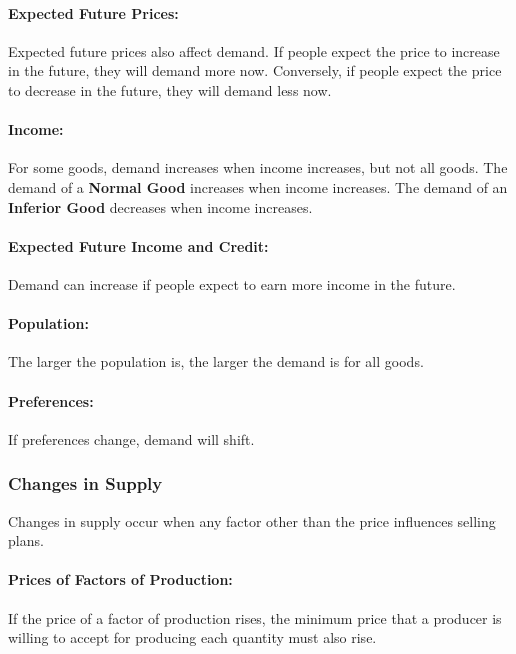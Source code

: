 \documentclass[letterpaper, 12pt]{article}
\begin{document}
\paragraph{Expected Future Prices:}
Expected future prices also affect demand. If people expect the price to
increase in the future, they will demand more now. Conversely, if people
expect the price to decrease in the future, they will demand less now.

\paragraph{Income:}
For some goods, demand increases when income increases, but not all goods.
The demand of a \textbf{Normal Good} increases when income increases. The
demand of an \textbf{Inferior Good} decreases when income increases.

\paragraph{Expected Future Income and Credit:}
Demand can increase if people expect to earn more income in the future.

\paragraph{Population:} The larger the population is, the larger the demand is
for all goods.

\paragraph{Preferences:} If preferences change, demand will shift.

\subsubsection{Changes in Supply}
Changes in supply occur when any factor other than the price influences selling plans.

\paragraph{Prices of Factors of Production:}
If the price of a factor of production rises, the minimum price that a producer
is willing to accept for producing each quantity must also rise.
\end{document}
